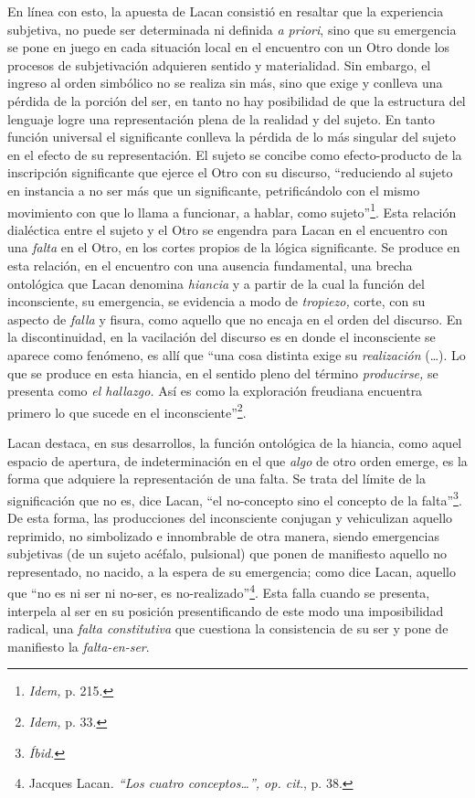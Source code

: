 En línea con esto, la apuesta de Lacan consistió en resaltar que la experiencia subjetiva, no puede ser determinada ni definida \emph{a priori}, sino que su emergencia se pone en juego en cada situación local en el encuentro con un Otro donde los procesos de subjetivación adquieren sentido y materialidad. Sin embargo, el ingreso al orden simbólico no se realiza sin más, sino que exige y conlleva una pérdida de la porción del ser, en tanto no hay posibilidad de que la estructura del lenguaje logre una representación plena de la realidad y del sujeto. En tanto función universal el significante conlleva la pérdida de lo más singular del sujeto en el efecto de su representación. El sujeto se concibe como efecto-producto de la inscripción significante que ejerce el Otro con su discurso, \enquote{reduciendo al sujeto en instancia a no ser más que un significante, petrificándolo con el mismo movimiento con que lo llama a funcionar, a hablar, como sujeto}\footnote{\emph{Idem,} p. 215.}. Esta relación dialéctica entre el sujeto y el Otro se engendra para Lacan en el encuentro con una \emph{falta} en el Otro, en los cortes propios de la lógica significante. Se produce en esta relación, en el encuentro con una ausencia fundamental, una brecha ontológica que Lacan denomina \emph{hiancia} y a partir de la cual la función del inconsciente, su emergencia, se evidencia a modo de \emph{tropiezo,} corte, con su aspecto de \emph{falla} y fisura, como aquello que no encaja en el orden del discurso. En la discontinuidad, en la vacilación del discurso es en donde el inconsciente se aparece como fenómeno, es allí que \enquote{una cosa distinta exige su \emph{realización} (\dots). Lo que se produce en esta hiancia, en el sentido pleno del término \emph{producirse,} se presenta como \emph{el hallazgo.} Así es como la exploración freudiana encuentra primero lo que sucede en el inconsciente}\footnote{\emph{Idem,} p. 33.}.

Lacan destaca, en sus desarrollos, la función ontológica de la hiancia, como aquel espacio de apertura, de indeterminación en el que \emph{algo} de otro orden emerge, es la forma que adquiere la representación de una falta. Se trata del límite de la significación que no es, dice Lacan, \enquote{el no-concepto sino el concepto de la falta}\footnote{\emph{Íbid.}}. De esta forma, las producciones del inconsciente conjugan y vehiculizan aquello reprimido, no simbolizado e innombrable de otra manera, siendo emergencias subjetivas (de un sujeto acéfalo, pulsional) que ponen de manifiesto aquello no representado, no nacido, a la espera de su emergencia; como dice Lacan, aquello que \enquote{no es ni ser ni no-ser, es no-realizado}\footnote{Jacques Lacan\emph{. \enquote{Los cuatro conceptos\ldots}, op. cit}., p. 38.}. Esta falla cuando se presenta, interpela al ser en su posición presentificando de este modo una imposibilidad radical, una \emph{falta constitutiva} que cuestiona la consistencia de su ser y pone de manifiesto la \emph{falta-en-ser}.

